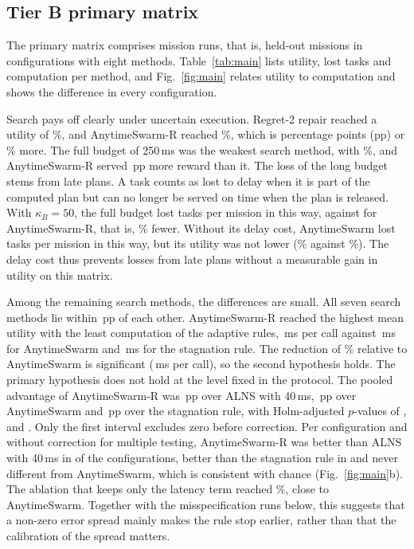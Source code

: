 \subsection{Tier B primary matrix}\label{sec:tierb}
The primary matrix comprises  mission runs, that is,  held-out missions in
 configurations with eight methods. Table~\ref{tab:main} lists utility, lost tasks and computation per
method, and Fig.~\ref{fig:main} relates utility to computation and shows the difference in every configuration.

Search pays off clearly under uncertain execution. Regret-2 repair reached a utility of \%, and
AnytimeSwarm-R reached \%, which is  percentage points (pp) or \% more. The
full budget of 250\,ms was the weakest search method, with \%, and AnytimeSwarm-R served \,pp
more reward than it. The loss of the long budget stems from late plans. A task counts as lost to delay when it is part of
the computed plan but can no longer be served on time when the plan is released. With $\kappa_B=50$, the full budget
lost  tasks per mission in this way, against  for AnytimeSwarm-R, that is,
\% fewer. Without its delay cost, AnytimeSwarm lost  tasks per mission in this
way, but its utility was not lower (\% against \%). The delay cost thus prevents losses from
late plans without a measurable gain in utility on this matrix.

Among the remaining search methods, the differences are small. All seven search methods lie within
\,pp of each other. AnytimeSwarm-R reached the highest mean utility with the least computation of the adaptive rules,
\,ms per call against \,ms for AnytimeSwarm and \,ms for the stagnation rule. The
reduction of \% relative to AnytimeSwarm is significant (\,ms per call), so the second
hypothesis holds. The primary hypothesis does not hold at the level fixed in the protocol. The pooled advantage of
AnytimeSwarm-R was \,pp over ALNS with 40\,ms, \,pp over AnytimeSwarm and \,pp
over the stagnation rule, with Holm-adjusted $p$-values of ,  and . Only the
first interval excludes zero before correction. Per configuration and without correction for multiple testing,
AnytimeSwarm-R was better than ALNS with 40\,ms in  of the  configurations, better
than the stagnation rule in  and never different from AnytimeSwarm, which is consistent with chance
(Fig.~\ref{fig:main}b). The ablation that keeps only the latency term reached \%, close to AnytimeSwarm.
Together with the misspecification runs below, this suggests that a non-zero error spread mainly makes the rule stop
earlier, rather than that the calibration of the spread matters.

